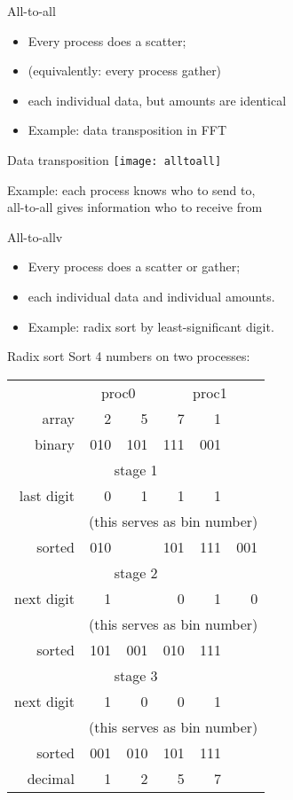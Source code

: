 \begin{numberedframe}{All-to-all}
  \begin{itemize}
  \item Every process does a scatter;
  \item (equivalently: every process gather)
  \item each individual data, but amounts are identical
  \item Example: data transposition in FFT
  \end{itemize}
\end{numberedframe}

\begin{numberedframe}{Data transposition}
  \texttt{[image: alltoall]}

  Example: each process knows who to send to, \\
  all-to-all gives information who to receive from
\end{numberedframe}

\begin{numberedframe}{All-to-allv}
  \begin{itemize}
  \item Every process does a scatter or gather;
  \item each individual data and individual amounts.
  \item Example: radix sort by least-significant digit.
  \end{itemize}
\end{numberedframe}

\begin{numberedframe}{Radix sort}
  \scriptsize
  Sort 4 numbers on two processes:

  \begin{tabular}{|r|rr|rrr|}
    \hline
    & \multicolumn{2}{|c}{proc0}&\multicolumn{3}{|c|}{proc1}\\
    array     & 2&5&7&1&\\
    binary    & 010& 101& 111& 001&\\
    \hline
    \multicolumn{6}{|c|}{stage 1}\\
    \hline
    last digit&   0&   1&   1&   1&\\
    &\multicolumn{5}{|c|}{(this serves as bin number)}\\
    sorted    & 010&    & 101& 111& 001\\
    \multicolumn{6}{|c|}{stage 2}\\
    \hline
    next digit&  1 &    &  0 &  1 &  0\\
    &\multicolumn{5}{|c|}{(this serves as bin number)}\\
    sorted    & 101& 001& 010& 111&\\
    \multicolumn{6}{|c|}{stage 3}\\
    \hline
    next digit& 1  & 0  & 0  & 1&\\
    &\multicolumn{5}{|c|}{(this serves as bin number)}\\
    sorted    & 001& 010& 101& 111&\\
    decimal   & 1  & 2  & 5  & 7&\\
    \hline
  \end{tabular}
\end{numberedframe}

